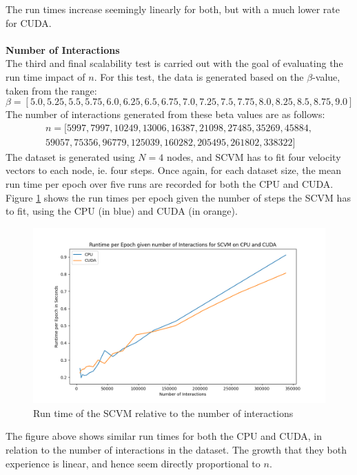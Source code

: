 The run times increase seemingly linearly for both, but with a much lower rate for CUDA.
\\\\
\textbf{Number of Interactions}
\\
The third and final scalability test is carried out with the goal of evaluating the run time impact of $n$.
For this test, the data is generated based on the $\beta$-value, taken from the range:
\begin{equation*}
    \beta = [5.0, 5.25, 5.5, 5.75, 6.0, 6.25, 6.5, 6.75, 7.0, 7.25, 7.5, 7.75, 8.0, 8.25, 8.5, 8.75, 9.0]
\end{equation*}
The number of interactions generated from these beta values are as follows:
\begin{align*}
    n = [5997, 7997, 10249, 13006, 16387, 21098, 27485, 35269, 45884, 
    \\59057, 75356, 96779, 125039, 160282, 205495, 261802, 338322]
\end{align*}
\noindent
The dataset is generated using $N = 4$ nodes, and SCVM has to fit four velocity vectors to each node, ie. four steps.
Once again, for each dataset size, the mean run time per epoch over five runs are recorded for both the CPU and CUDA.
Figure \ref{fig:NumInteractionsRuntimes} shows the run times per epoch given the number of steps the SCVM has to fit, using the CPU (in blue) and CUDA (in orange).

\begin{figure}[H]
    \centering
    \includegraphics[width=\textwidth]{0_images/numinteractions_runtime2.png}
    \caption{Run time of the SCVM relative to the number of interactions}
    \label{fig:NumInteractionsRuntimes}
\end{figure}
\noindent
The figure above shows similar run times for both the CPU and CUDA, in relation to the number of interactions in the dataset.
The growth that they both experience is linear, and hence seem directly proportional to $n$.
